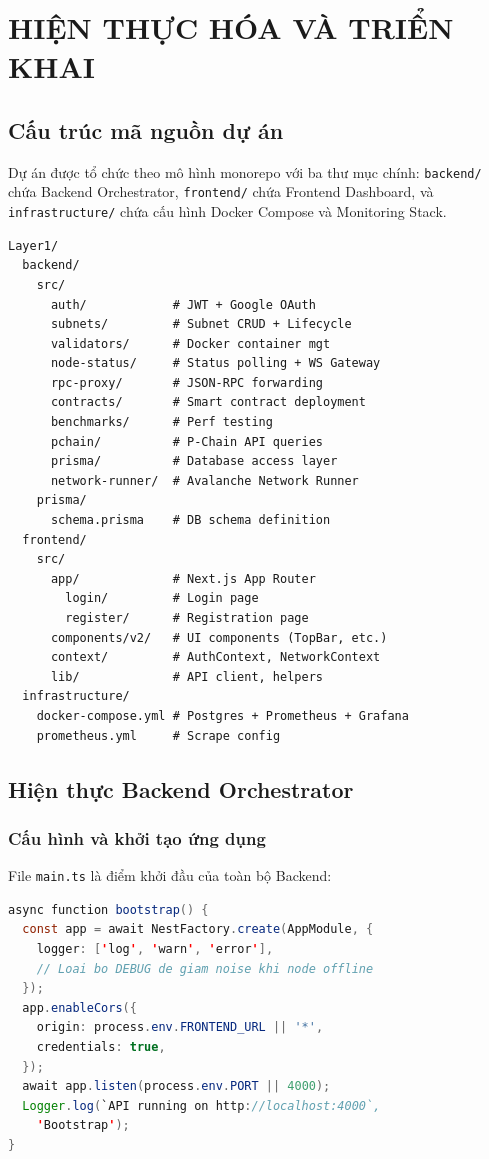 \chapter{HIỆN THỰC HÓA VÀ TRIỂN KHAI}

\section{Cấu trúc mã nguồn dự án}

Dự án được tổ chức theo mô hình monorepo với ba thư mục chính: \texttt{backend/} chứa Backend Orchestrator, \texttt{frontend/} chứa Frontend Dashboard, và \texttt{infrastructure/} chứa cấu hình Docker Compose và Monitoring Stack.

\begin{lstlisting}[caption={Cấu trúc thư mục dự án}, label={lst:project_structure}, language={}]
Layer1/
  backend/
    src/
      auth/            # JWT + Google OAuth
      subnets/         # Subnet CRUD + Lifecycle
      validators/      # Docker container mgt
      node-status/     # Status polling + WS Gateway
      rpc-proxy/       # JSON-RPC forwarding
      contracts/       # Smart contract deployment
      benchmarks/      # Perf testing
      pchain/          # P-Chain API queries
      prisma/          # Database access layer
      network-runner/  # Avalanche Network Runner
    prisma/
      schema.prisma    # DB schema definition
  frontend/
    src/
      app/             # Next.js App Router
        login/         # Login page
        register/      # Registration page
      components/v2/   # UI components (TopBar, etc.)
      context/         # AuthContext, NetworkContext
      lib/             # API client, helpers
  infrastructure/
    docker-compose.yml # Postgres + Prometheus + Grafana
    prometheus.yml     # Scrape config
\end{lstlisting}

\section{Hiện thực Backend Orchestrator}

\subsection{Cấu hình và khởi tạo ứng dụng}

File \texttt{main.ts} là điểm khởi đầu của toàn bộ Backend:

\begin{lstlisting}[caption={main.ts --- Khởi tạo ứng dụng NestJS}, label={lst:main_ts}, language=Java]
async function bootstrap() {
  const app = await NestFactory.create(AppModule, {
    logger: ['log', 'warn', 'error'],
    // Loai bo DEBUG de giam noise khi node offline
  });
  app.enableCors({
    origin: process.env.FRONTEND_URL || '*',
    credentials: true,
  });
  await app.listen(process.env.PORT || 4000);
  Logger.log(`API running on http://localhost:4000`,
    'Bootstrap');
}
\end{lstlisting}

